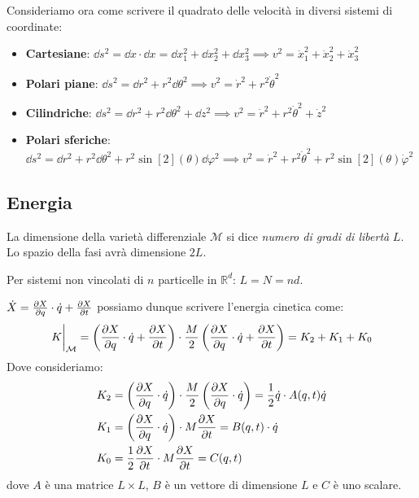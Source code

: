 Consideriamo ora come scrivere il quadrato delle velocità in diversi sistemi di coordinate:
\begin{itemize}
    \item \textbf{Cartesiane}: $\dd{s^2}= \dd{x}\cdot\dd{x}= \dd{x_1^2}+\dd{x_2^2}+\dd{x_3^2}\implies v^2= \dot{x}_1^2+\dot{x}_2^2+\dot{x}_3^2$
    \item \textbf{Polari piane}: $\dd{s^2}= \dd{r^2}+r^2\dd{\theta^2}\implies v^2=\dot{r}^2+r^2\dot{\theta}^2$
    \item \textbf{Cilindriche}: $\dd{s^2}= \dd{r^2}+r^2\dd{\theta^2}+\dd{z^2}\implies v^2= \dot{r}^2+r^2\dot{\theta}^2+\dot{z}^2$
    \item \textbf{Polari sferiche}: $\dd{s^2}= \dd{r^2}+r^2\dd{\theta^2}+r^2\sin[2](\theta)\dd{\varphi^2}\implies v^2 = \dot{r}^2+r^2\dot{\theta}^2+r^2\sin[2](\theta)\dot{\varphi}^2$
\end{itemize}


\subsection{Energia}

\begin{definition}
    La dimensione della varietà differenziale $\mathcal{M}$ si dice \textit{numero di gradi di libertà} $L$. Lo spazio della fasi avrà dimensione $2L$.
\end{definition}
Per sistemi non vincolati di $n $ particelle in $\mathbb{R}^d$: $L = N = nd$.

\begin{remark}
    $\dot{X}= \pdv{X}{q}\cdot \dot{q}+ \pdv{X}{t}$ possiamo dunque scrivere l'energia cinetica come:
    \begin{equation}
        \eval{K}_{\mathcal{M}}= \left( \pdv{X}{q}\cdot \dot{q}+ \pdv{X}{t} \right)\cdot \frac{M}{2}\left( \pdv{X}{q}\cdot \dot{q}+ \pdv{X}{t} \right)= K_2+K_1+K_0
    \end{equation}
    Dove consideriamo:
    \begin{align}
    K_2 &= \left( \pdv{X}{q}\cdot \dot{q} \right)\cdot \frac{M}{2}\left( \pdv{X}{q}\cdot \dot{q} \right)= \frac{1}{2}\dot{q}\cdot A(q,t)\dot{q}\\
    K_1 &= \left( \pdv{X}{q}\cdot \dot{q} \right)\cdot M\pdv{X}{t}=B(q,t)\cdot \dot{q}\\
    K_0 &= \frac{1}{2}\pdv{X}{t}\cdot M\pdv{X}{t}= C (q,t) 
    \end{align}
    dove $A$ è una matrice $L\times L $, $B $ è un vettore di dimensione $L $ e $C $ è uno scalare.
\end{remark}

